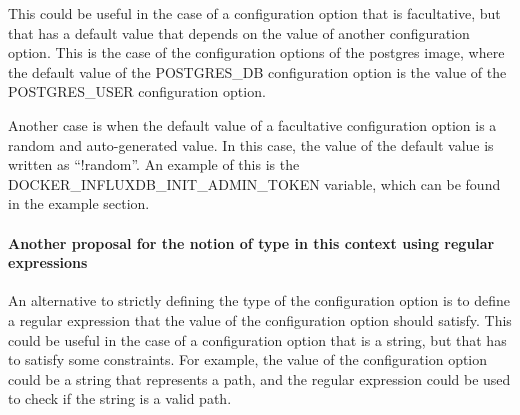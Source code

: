 \documentclass[
  11pt,
]{article}
\newenvironment{Shaded}{}{}
\newcommand{\DataTypeTok}[1]{\textcolor[rgb]{0.56,0.13,0.00}{#1}}
\newcommand{\FunctionTok}[1]{\textcolor[rgb]{0.02,0.16,0.49}{#1}}
\newcommand{\KeywordTok}[1]{\textcolor[rgb]{0.00,0.44,0.13}{\textbf{#1}}}
\newcommand{\StringTok}[1]{\textcolor[rgb]{0.25,0.44,0.63}{#1}}
\begin{document}
This could be useful in the case of a configuration option that is
facultative, but that has a default value that depends on the value of
another configuration option. This is the case of the configuration
options of the postgres image, where the default value of the
POSTGRES\_DB configuration option is the value of the POSTGRES\_USER
configuration option.

\begin{Shaded}
\end{Shaded}

Another case is when the default value of a facultative configuration
option is a random and auto-generated value. In this case, the value of
the default value is written as ``!random''. An example of this is the
DOCKER\_INFLUXDB\_INIT\_ADMIN\_TOKEN variable, which can be found in the
example section.

\hypertarget{another-proposal-for-the-notion-of-type-in-this-context-using-regular-expressions}{%
\paragraph{Another proposal for the notion of type in this context using
regular
expressions}\label{another-proposal-for-the-notion-of-type-in-this-context-using-regular-expressions}}

An alternative to strictly defining the type of the configuration option
is to define a regular expression that the value of the configuration
option should satisfy. This could be useful in the case of a
configuration option that is a string, but that has to satisfy some
constraints. For example, the value of the configuration option could be
a string that represents a path, and the regular expression could be
used to check if the string is a valid path.
\end{document}
